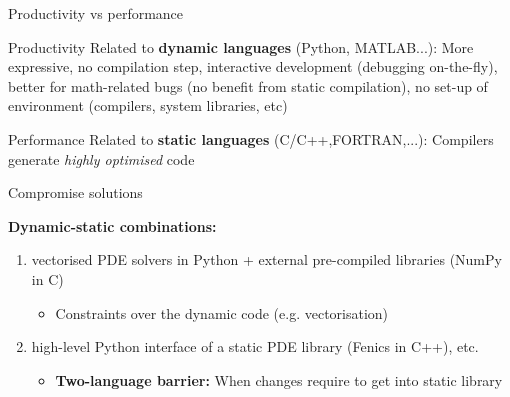 \begin{frame}{Productivity vs performance}

\begin{block}{Productivity}
Related to \textbf{dynamic languages} (Python, MATLAB...): More expressive, no compilation step, interactive development (debugging on-the-fly), better for math-related bugs (no benefit from static compilation), no set-up of environment (compilers, system libraries, etc)
\end{block}

\begin{block}{Performance}
Related to \textbf{static languages} (C/C++,FORTRAN,...): Compilers generate \emph{highly optimised} code
\end{block}

\end{frame}

\begin{frame}{Compromise solutions}

\textbf{Dynamic-static combinations:}

\begin{enumerate}
\item vectorised PDE solvers in Python + external pre-compiled libraries (NumPy in C)
\begin{itemize}
  \item Constraints over the dynamic code (e.g. vectorisation)
\end{itemize}
\item high-level Python interface of a static PDE library (Fenics in C++), etc.
\begin{itemize}
  \item \textbf{Two-language barrier:} When changes require to get into static library
\end{itemize}
\end{enumerate}


\end{frame}

